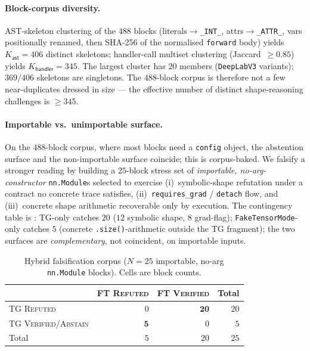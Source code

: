 \paragraph{Block-corpus diversity.}
AST-skeleton clustering of the $488$ blocks (literals$\to$\texttt{\_INT\_},
attrs$\to$\texttt{\_ATTR\_}, vars positionally renamed, then
SHA-256 of the normalised \texttt{forward} body) yields
$K_{\mathsf{ast}}{=}406$ distinct skeletons; handler-call
multiset clustering (Jaccard~$\ge 0.85$) yields
$K_{\mathsf{handler}}{=}345$. The largest cluster has $20$
members (\texttt{DeepLabV3} variants); $369/406$ skeletons are
singletons. The $488$-block corpus is therefore not a few
near-duplicates dressed in size --- the effective number of
distinct shape-reasoning challenges is $\ge 345$.

\paragraph{Importable vs.\ unimportable surface.}
On the $488$-block corpus, where most blocks need a
\texttt{config} object, the abstention surface and the
non-importable surface coincide; this is corpus-baked. We
falsify a stronger reading by building a $25$-block stress set
of \emph{importable, no-arg-constructor} \texttt{nn.Module}s
selected to exercise (i)~symbolic-shape refutation under a
contract no concrete trace satisfies, (ii)~\texttt{requires\_grad}
/ \texttt{detach} flow, and (iii)~concrete shape arithmetic
recoverable only by execution. The contingency table is
: \textsc{TG}-only catches $20$
($12$ symbolic shape, $8$ grad-flag); \texttt{FakeTensorMode}-only
catches $5$ (concrete \texttt{.size()}-arithmetic outside the
\textsc{TG} fragment); the two surfaces are \emph{complementary},
not coincident, on importable inputs.

\begin{table}[t]
\centering\small\setlength{\tabcolsep}{6pt}
\caption{Hybrid falsification corpus ($N{=}25$ importable, no-arg
\texttt{nn.Module} blocks). Cells are block counts.}
\label{tab:hybrid-falsify}
\begin{tabular}{l rr | r}
\toprule
& FT \textsc{Refuted} & FT \textsc{Verified} & Total \\
\midrule
\textsc{TG} \textsc{Refuted}     & $0$  & $\mathbf{20}$ & $20$ \\
\textsc{TG} \textsc{Verified/Abstain} & $\mathbf{5}$ & $0$  & $5$  \\
\midrule
Total                            & $5$  & $20$          & $25$ \\
\bottomrule
\end{tabular}
\end{table}

